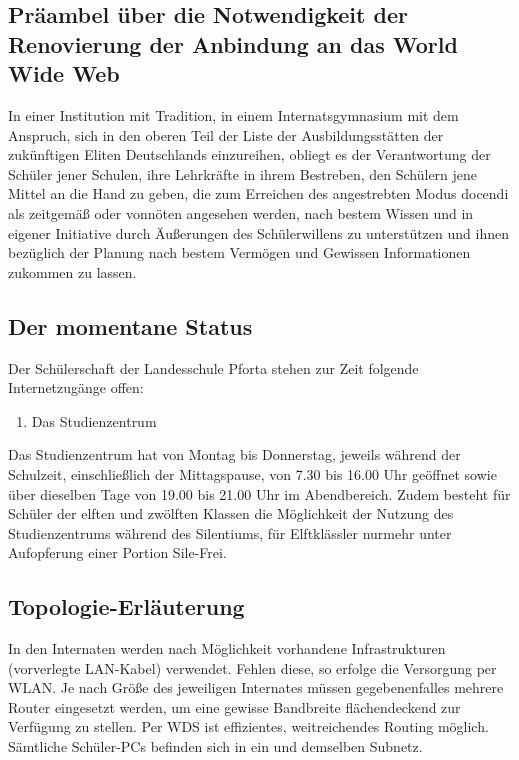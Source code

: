 \subsection*{Präambel über die Notwendigkeit der Renovierung der Anbindung an das World Wide Web}
In einer Institution mit Tradition, in einem Internatsgymnasium mit dem Anspruch, sich in den oberen Teil der Liste der Ausbildungsstätten der zukünftigen Eliten Deutschlands einzureihen, obliegt es der Verantwortung der Schüler jener Schulen, ihre Lehrkräfte in ihrem Bestreben, den Schülern jene Mittel an die Hand zu geben, die zum Erreichen des angestrebten Modus docendi als zeitgemäß oder vonnöten angesehen werden, nach bestem Wissen und in eigener Initiative durch Äußerungen des Schülerwillens zu unterstützen und ihnen bezüglich der Planung nach bestem Vermögen und Gewissen Informationen zukommen zu lassen.

\subsection*{Der momentane Status}

Der Schülerschaft der Landesschule Pforta stehen zur Zeit folgende Internetzugänge offen:
\begin{enumerate}
 \item Das Studienzentrum
\end{enumerate}

Das Studienzentrum hat von Montag bis Donnerstag, jeweils während der Schulzeit, einschließlich der Mittagspause, von 7.30 bis 16.00 Uhr geöffnet sowie über dieselben Tage von 19.00 bis 21.00 Uhr im Abendbereich. Zudem besteht für Schüler der elften und zwölften Klassen die Möglichkeit der Nutzung des Studienzentrums während des Silentiums, für Elftklässler nurmehr unter Aufopferung einer Portion \gfu Sile-Frei\grqq.

\subsection*{Topologie-Erläuterung}
In den Internaten werden nach Möglichkeit vorhandene Infrastrukturen (vorverlegte LAN-Kabel) verwendet. Fehlen diese, so erfolge die Versorgung per WLAN. Je nach Größe des jeweiligen Internates müssen gegebenenfalles mehrere Router eingesetzt werden, um eine gewisse Bandbreite flächendeckend zur Verfügung zu stellen. Per WDS ist effizientes, weitreichendes Routing möglich. Sämtliche Schüler-PCs befinden sich in ein und demselben Subnetz.

